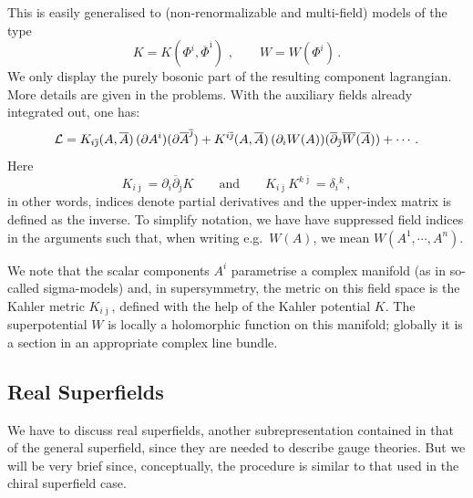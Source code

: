 \documentclass[12pt]{article}
\newcommand{\be}{\begin{equation}}
\newcommand{\ee}{\end{equation}}
\newcommand{\ol}{\overline}
\numberwithin{equation}{section}
\begin{document}
This is easily generalised to (non-renormalizable and multi-field) models of the type
\be
K=K(\Phi^i,\ol{\Phi}^{\ol{\imath}})\,\,,\qquad W=W(\Phi^i)\,.
\ee
We only display the purely bosonic part of the resulting component lagrangian. 
More details are given in the problems. With the auxiliary fields already integrated out, one has:
\be
{\cal L}=K_{i\ol{\jmath}}(A,\ol{A})\,(\partial A^i)(\partial \ol{A}^{\ol{\jmath}}) +K^{i\ol{\jmath}}(A,\ol{A})\,(\partial_i W(A))(\ol{\partial}_{\ol{\jmath}} \ol{W}(\ol{A}))+\cdots\,.
\ee
Here
\be
K_{i\ol{\jmath}}=\partial_i \ol{\partial}_{\ol{\jmath}} K\qquad\mbox{and} \qquad K_{i\ol{\jmath}}K^{k\ol{\jmath}}=\delta_i{}^k\,,
\ee
in other words, indices denote partial derivatives and the upper-index matrix is defined as the inverse. To simplify notation, we have have suppressed field indices in the arguments such that, when writing e.g.~$W(A)$, we mean $W(A^1,\cdots,A^n)$.

We note that the scalar components $A^i$ parametrise a complex manifold (as in so-called sigma-models) and, in supersymmetry, the metric on this field space is the Kahler metric $K_{i\ol{\jmath}}$, defined with the help of the Kahler potential $K$. The superpotential $W$ is locally a holomorphic function on this manifold; globally it is a section in an appropriate complex line bundle.






\subsection{Real Superfields}
We have to discuss real superfields, another subrepresentation contained in that of the general superfield, since they are needed to describe gauge theories. But we will be very brief since, conceptually, the procedure is similar to that used in the chiral superfield case.
\end{document}
